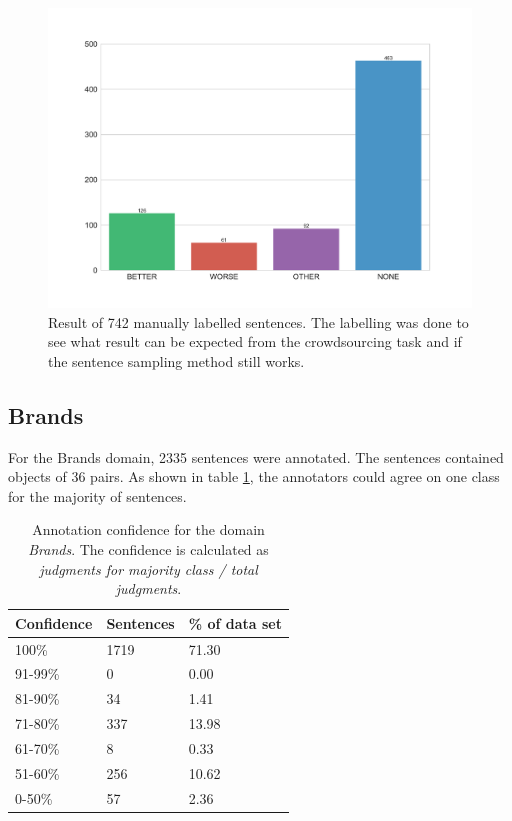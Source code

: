 \begin{figure}[h]
\centering
\caption{Result of 742 manually labelled sentences. The labelling was done to see what result can be expected from the crowdsourcing task and if the sentence sampling method still works.}
\label{fig:sample}
\includegraphics[width=1\linewidth]{images/dataset/pre-dist}
\end{figure}
\FloatBarrier
\subsection{Brands}
\label{sec:brands}

For the Brands domain, 2335 sentences were annotated. The sentences contained objects of 36 pairs. As shown in table \ref{fig:brand_agg}, the annotators could agree on one class for the majority of sentences.


\begin{table}[h]
\caption{Annotation confidence for the domain \emph{Brands}. The confidence is calculated as \emph{judgments for majority class / total judgments}.}
\label{fig:brand_agg}
\begin{tabularx}{\textwidth}{XXX}
\toprule
Confidence & Sentences & \% of data set \\
\midrule
100\%	&	1719	&	71.30	 \\ 
91-99\%	&	0	&	0.00	 \\ 
81-90\%	&	34	&	1.41	 \\ 
71-80\%	&	337	&	13.98	 \\ 
61-70\%	&	8	&	0.33	 \\ 
51-60\%	&	256	&	10.62	 \\ 
0-50\%	&	57	&	2.36	 \\ 
\bottomrule
\end{tabularx}
\end{table}



